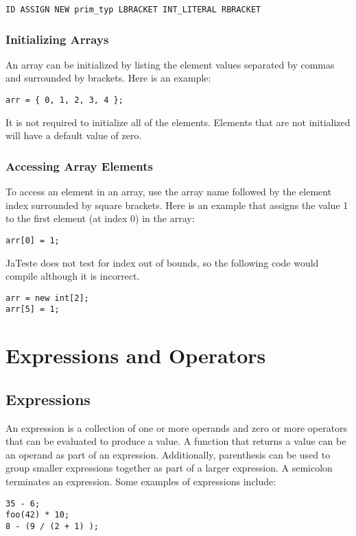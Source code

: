 \documentclass{article}
\begin{document}
\begin{Verbatim}[frame=single]
ID ASSIGN NEW prim_typ LBRACKET INT_LITERAL RBRACKET
\end{Verbatim}

\subsubsection{Initializing Arrays}
An array can be initialized by listing the element values separated by commas and surrounded by brackets. Here is an example:

 \begin{lstlisting}
arr = { 0, 1, 2, 3, 4 };
\end{lstlisting}

It is not required to initialize all of the elements. Elements that are not initialized will have a default value of zero.

\subsubsection{Accessing Array Elements}
To access an element in an array, use the array name followed by the element index surrounded by square brackets. Here is an example that assigns the value 1 to the first element (at index 0) in the array:

 \begin{lstlisting}
arr[0] = 1;
\end{lstlisting}

JaTeste does not test for index out of bounds, so the following code would compile although it is incorrect. 

 \begin{lstlisting}
arr = new int[2];
arr[5] = 1;
\end{lstlisting}

\section{Expressions and Operators}

\subsection{Expressions}
An expression is a collection of one or more operands and zero or more operators that can be evaluated to produce a value.  A function that returns a value can be an operand as part of an expression.  Additionally, parenthesis can be used to group smaller expressions together as part of a larger expression.  A semicolon terminates an expression.  Some examples of expressions include:
\begin{lstlisting}
35 - 6;
foo(42) * 10;
8 - (9 / (2 + 1) );
\end{lstlisting}
\end{document}
